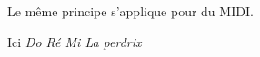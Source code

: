 \documentclass[preview]{standalone}
\begin{document}
\begin{center}
Le même principe s'applique pour du MIDI.
    
    Ici \em{Do Ré Mi La perdrix}
\end{center}
\end{document}
